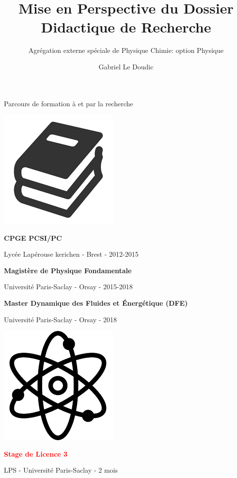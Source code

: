 \documentclass[aspectratio=169,10pt]{beamer}
\title{Mise en Perspective du Dossier Didactique de Recherche}
\subtitle{Agrégation externe spéciale de Physique Chimie: option Physique}
\author{\large Gabriel Le Doudic}
\date{}
\begin{document}
\maketitle

\begin{frame}{Parcours de formation à et par la recherche}
  \centering
\begin{minipage}{.32\linewidth}
\centering
\includegraphics[width=.25\linewidth]{./figures/etudes.jpg}\smallskip

\textbf{CPGE PCSI/PC}\smallskip

Lycée Lapérouse kerichen - Brest - 2012-2015\smallskip

\textbf{Magistère de Physique Fondamentale}\smallskip

Université Paris-Saclay - Orsay - 2015-2018\smallskip

\textbf{Master Dynamique des Fluides et Énergétique (DFE)}\smallskip

Université Paris-Saclay - Orsay - 2018\smallskip


\end{minipage}\hfill
\begin{minipage}{.3\linewidth}
  \centering
\includegraphics[width=.25\linewidth]{./figures/stages.jpg}\smallskip

\textbf{\textcolor{red}{Stage de Licence 3}}\smallskip

LPS - Université Paris-Saclay - 2 mois \smallskip


\end{minipage}
\end{frame}
\end{document}
